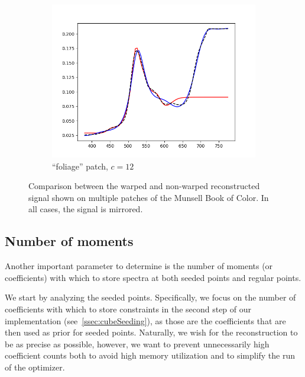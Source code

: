 \begin{figure}[t]
\begin{subfigure}[t]{0.45\textwidth}
		\includegraphics[width=\linewidth]{img/results_techniqueFoliage.png}
		\caption{``foliage'' patch, $c = 12$}
		\label{fig:resultsWarping_foliage}
	\end{subfigure}
	\caption{Comparison between the warped and non-warped reconstructed signal shown on multiple patches of the Munsell Book of Color. In all cases, the signal is mirrored.}
	\label{fig:resultsWarping}
\end{figure}

\subsection{Number of moments} \label{ssec:noOfMoments}

Another important parameter to determine is the number of moments (or coefficients) with which to store spectra at both seeded points and regular points.

We start by analyzing the seeded points. Specifically, we focus on the number of coefficients with which to store constraints in the second step of our implementation (see~\cref{ssec:cubeSeeding}), as those are the coefficients that are then used as prior for seeded points. Naturally, we wish for the reconstruction to be as precise as possible, however, we want to prevent unnecessarily high coefficient counts both to avoid high memory utilization and to simplify the run of the optimizer.

